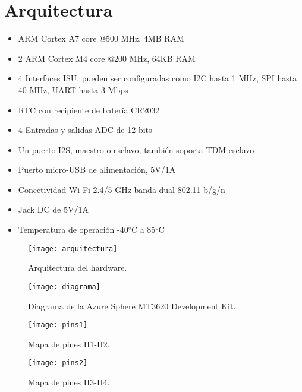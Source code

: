 \section{Arquitectura}
\begin{itemize}
	\item
	ARM Cortex A7 core @500 MHz, 4MB RAM
	\item
	2 ARM Cortex M4 core @200 MHz, 64KB RAM
	\item
	4 Interfaces ISU, pueden ser configuradas como I2C hasta 1 MHz, SPI hasta 40 MHz, UART hasta 3 Mbps
	\item
	RTC con recipiente de batería CR2032
	\item
	4 Entradas y salidas ADC de 12 bits
	\item
	Un puerto I2S, maestro o esclavo, también soporta TDM esclavo
	\item
	Puerto micro-USB de alimentación, 5V/1A
	\item
	Conectividad Wi-Fi 2.4/5 GHz banda dual 802.11 b/g/n
	\item
	Jack DC de 5V/1A
	\item
	Temperatura de operación -40°C a 85°C
\end{itemize}	
\begin{figure}[h]
	\centering
	\texttt{[image: arquitectura]}
	\caption{Arquitectura del hardware.}
\end{figure}

\begin{figure}[h]
	\centering
	\texttt{[image: diagrama]}
	\caption{Diagrama de la Azure Sphere MT3620 Development Kit.}
\end{figure}

\begin{figure}[h]
	\centering
	\texttt{[image: pins1]}
	\caption{Mapa de pines H1-H2.}
\end{figure}

\begin{figure}[h]
	\centering
	\texttt{[image: pins2]}
	\caption{Mapa de pines H3-H4.}
\end{figure}